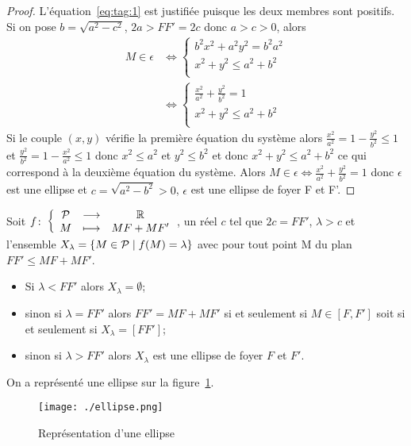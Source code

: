 \begin{proof}
L'équation~\eqref{eq:tag:1} est justifiée puisque les deux membres sont positifs. Si on  pose $b=\sqrt{a^2-c^2}$, $2a>FF'=2c$ donc $a>c>0$, alors
\begin{align}
  M \in \epsilon & \iff \begin{cases} b^2x^2 +a^2y^2=b^2a^2 \\ x^2+y^2 \leqslant a^2 +b^2\\\end{cases}\\
  & \iff \begin{cases} \frac{x^2}{a^2} +\frac{y^2}{b^2}=1\\ x^2+y^2 \leqslant a^2 +b^2 \\\end{cases}
\end{align}
Si le couple $(x,y)$ vérifie la première équation du système alors $\frac{x^2}{a^2}=1-\frac{y^2}{b^2}\leqslant 1$ et $\frac{y^2}{b^2}=1-\frac{x^2}{a^2} \leqslant 1$ donc $x^2 \leqslant a^2$ et $y^2 \leqslant b^2$ et donc $x^2+y^2 \leqslant a^2+b^2$ ce qui correspond à la deuxième équation du système.
Alors $M \in \epsilon \iff \frac{x^2}{a^2} +\frac{y^2}{b^2}=1$ donc $\epsilon$ est une ellipse et $c=\sqrt{a^2-b^2}>0$, $\epsilon$ est une ellipse de foyer F et F'.
\end{proof}
Soit $f\colon \left\{\begin{array}{ccc} \mathcal{P} & \longrightarrow &\mathbb{R}\\ M & \longmapsto & MF+MF' \end{array} \right.$, un réel $c$ tel que $2c=FF'$, $\lambda>c$ et l'ensemble $X_\lambda=\left\{M \in \mathcal{P}\mathrel{}\middle|\mathrel{}f(M)=\lambda\right\}$ avec pour tout point M du plan $FF'\leqslant MF+MF'$.
\begin{itemize}
\item Si $\lambda < FF'$ alors $X_\lambda=\emptyset$;
\item sinon si $\lambda=FF'$ alors $FF'=MF+MF'$ si et seulement si $M \in [F,F']$ soit si et seulement si $X_\lambda=[FF']$;
\item sinon si $\lambda >FF'$ alors $X_\lambda$ est une ellipse de foyer $F$ et $F'$.
\end{itemize}

On a représenté une ellipse sur la figure~\ref{fig:ellipse}.

\begin{figure}[!h]
  \centering
  \texttt{[image: ./ellipse.png]}
  \caption{Représentation d'une ellipse}
  \label{fig:ellipse}
\end{figure}


